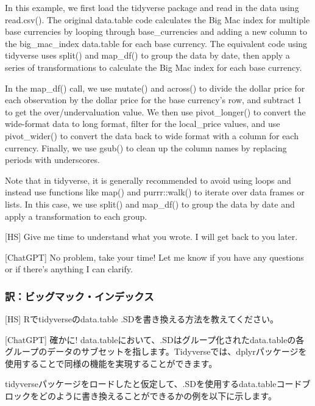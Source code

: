 \documentclass[
]{bxjsbook}
\theoremstyle{definition}
\theoremstyle{definition}
\theoremstyle{definition}
\theoremstyle{definition}
\theoremstyle{remark}
\begin{document}
In this example, we first load the tidyverse package and read in the data using read.csv(). The original data.table code calculates the Big Mac index for multiple base currencies by looping through base\_currencies and adding a new column to the big\_mac\_index data.table for each base currency. The equivalent code using tidyverse uses split() and map\_df() to group the data by date, then apply a series of transformations to calculate the Big Mac index for each base currency.

In the map\_df() call, we use mutate() and across() to divide the dollar price for each observation by the dollar price for the base currency's row, and subtract 1 to get the over/undervaluation value. We then use pivot\_longer() to convert the wide-format data to long format, filter for the local\_price values, and use pivot\_wider() to convert the data back to wide format with a column for each currency. Finally, we use gsub() to clean up the column names by replacing periods with underscores.

Note that in tidyverse, it is generally recommended to avoid using loops and instead use functions like map() and purrr::walk() to iterate over data frames or lists. In this case, we use split() and map\_df() to group the data by date and apply a transformation to each group.

{[}HS{]} Give me time to understand what you wrote. I will get back to you later.

{[}ChatGPT{]} No problem, take your time! Let me know if you have any questions or if there's anything I can clarify.

\hypertarget{bigmacindexj}{%
\subsubsection{訳：ビッグマック・インデックス}\label{bigmacindexj}}

{[}HS{]} Rでtidyverseのdata.table .SDを書き換える方法を教えてください。

{[}ChatGPT{]} 確かに! data.tableにおいて、.SDはグループ化されたdata.tableの各グループのデータのサブセットを指します。Tidyverseでは、dplyrパッケージを使用することで同様の機能を実現することができます。

tidyverseパッケージをロードしたと仮定して、.SDを使用するdata.tableコードブロックをどのように書き換えることができるかの例を以下に示します。
\end{document}
